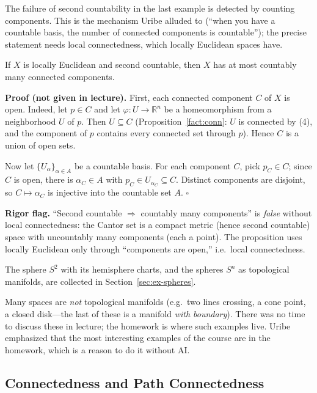 \documentclass[11pt]{report}
\makeatletter
\newcounter{thmcounter}[section]
\renewenvironment{proof}[1][Proof]{\noindent\textbf{#1.} }{\hfill$\square$\par\vspace{5pt}}
\newcommand{\thmlabel}[1]{\edef\@currentlabel{\arabic{section}.\arabic{thmcounter}}\label{#1}}
\newcommand{\leeref}[1]{\par\smallskip{\raggedleft\footnotesize\textsc{Lee}:\ #1\par}}
\makeatother
\begin{document}
The failure of second countability in the last example is detected by counting components. This is the mechanism Uribe alluded to (``when you have a countable basis, the number of connected components is countable''); the precise statement needs local connectedness, which locally Euclidean spaces have.

\begin{propbox}\thmlabel{prop:count-components}
If $X$ is locally Euclidean and second countable, then $X$ has at most countably many connected components.
\leeref{Proposition 1.11(d)}
\end{propbox}

\begin{proof}[Proof (not given in lecture)]
First, each connected component $C$ of $X$ is open. Indeed, let $p \in C$ and let $\varphi : U \to \mathbb{R}^n$ be a homeomorphism from a neighborhood $U$ of $p$. Then $U \subseteq C$ (Proposition~\ref{fact:conn}: $U$ is connected by (4), and the component of $p$ contains every connected set through $p$). Hence $C$ is a union of open sets.

Now let $\{U_\alpha\}_{\alpha \in A}$ be a countable basis. For each component $C$, pick $p_C \in C$; since $C$ is open, there is $\alpha_C \in A$ with $p_C \in U_{\alpha_C} \subseteq C$. Distinct components are disjoint, so $C \mapsto \alpha_C$ is injective into the countable set $A$.
\end{proof}

\textbf{Rigor flag.} ``Second countable $\Rightarrow$ countably many components'' is \emph{false} without local connectedness: the Cantor set is a compact metric (hence second countable) space with uncountably many components (each a point). The proposition uses locally Euclidean only through ``components are open,'' i.e.\ local connectedness.



The sphere $S^2$ with its hemisphere charts, and the spheres $S^n$ as topological manifolds, are collected in Section~\ref{sec:ex-spheres}.


Many spaces are \emph{not} topological manifolds (e.g.\ two lines crossing, a cone point, a closed disk---the last of these is a manifold \emph{with boundary}). There was no time to discuss these in lecture; the homework is where such examples live. Uribe emphasized that the most interesting examples of the course are in the homework, which is a reason to do it without AI.

\subsection{Connectedness and Path Connectedness}
\end{document}
